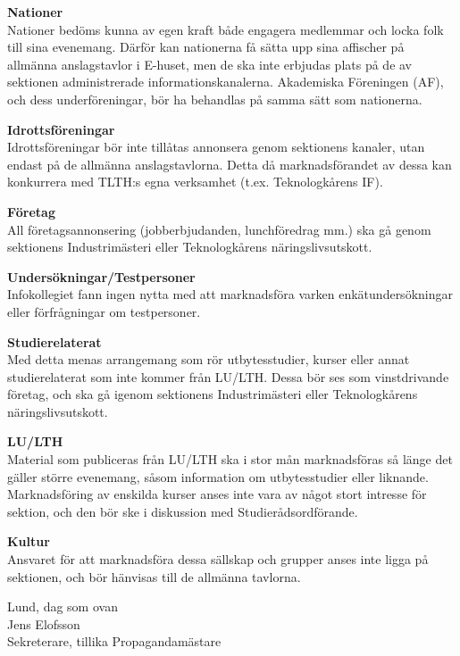 \documentclass{dsekprotokoll}
\begin{document}
\textbf{Nationer}\\
Nationer bedöms kunna av egen kraft både engagera medlemmar och locka folk till sina
evenemang. Därför kan nationerna få sätta upp sina affischer på allmänna anslagstavlor i
E-huset, men de ska inte erbjudas plats på de av sektionen administrerade informationskanalerna. Akademiska Föreningen (AF), och dess underföreningar, bör ha behandlas på
samma sätt som nationerna.

\textbf{Idrottsföreningar}\\
Idrottsföreningar bör inte tillåtas annonsera genom sektionens kanaler, utan endast på
de allmänna anslagstavlorna. Detta då marknadsförandet av dessa kan konkurrera med
TLTH:s egna verksamhet (t.ex. Teknologkårens IF).

\textbf{Företag}\\
All företagsannonsering (jobberbjudanden, lunchföredrag mm.) ska gå genom sektionens
Industrimästeri eller Teknologkårens näringslivsutskott.

\textbf{Undersökningar/Testpersoner}\\
Infokollegiet fann ingen nytta med att marknadsföra varken enkätundersökningar eller
förfrågningar om testpersoner.

\textbf{Studierelaterat}\\
Med detta menas arrangemang som rör utbytesstudier, kurser eller annat studierelaterat
som inte kommer från LU/LTH. Dessa bör ses som vinstdrivande företag, och ska gå
igenom sektionens Industrimästeri eller Teknologkårens näringslivsutskott.

\textbf{LU/LTH}\\
Material som publiceras från LU/LTH ska i stor mån marknadsföras så länge det gäller
större evenemang, såsom information om utbytesstudier eller liknande. Marknadsföring
av enskilda kurser anses inte vara av något stort intresse för sektion, och den bör ske i
diskussion med Studierådsordförande.

\textbf{Kultur}\\
Ansvaret för att marknadsföra dessa sällskap och grupper anses inte ligga på sektionen,
och bör hänvisas till de allmänna tavlorna.

\newpage

Lund, dag som ovan\\

Jens Elofsson \\
Sekreterare, tillika Propagandamästare
\end{document}
